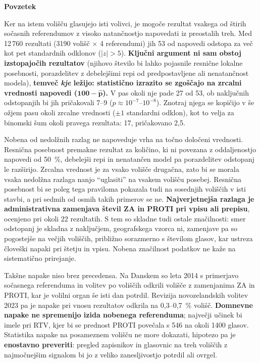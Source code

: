 \documentclass[11pt,a4paper]{article}
\begin{document}
{\small
\begin{center}\textbf{Povzetek}\end{center}\vspace{-1.2em}
\setlength{\parskip}{0.4em}
Ker na istem volišču glasujejo isti volivci, je mogoče rezultat vsakega od štirih sočasnih referendumov z visoko natančnostjo napovedati iz preostalih treh. Med 12\,760 rezultati (3190 volišč $\times$ 4 referendumi) jih 53 od napovedi odstopa za več kot pet standardnih odklonov ($|z|>5$). \textbf{Ključni argument ni sam obstoj izstopajočih rezultatov} (njihovo število bi lahko pojasnile resnične lokalne posebnosti, porazdelitev z debelejšimi repi od predpostavljene ali nenatančnost modela), \textbf{temveč \emph{kje} ležijo: statistično izrazito se zgoščajo na zrcalni vrednosti napovedi ($\boldsymbol{100-\hat p}$).} V pas okoli nje pade 27 od 53, ob naključnih odstopanjih bi jih pričakovali 7--9 ($p\approx10^{-7}$--$10^{-8}$). Znotraj njega se kopičijo v še ožjem pasu okoli zrcalne vrednosti ($\pm1$ standardni odklon), kot to velja za binomski šum okoli pravega rezultata: 17, pričakovano 2,5.

Nobena od nedolžnih razlag ne napoveduje vrha na točno določeni vrednosti. Resnična posebnost premakne rezultat za količino, ki ni povezana z oddaljenostjo napovedi od 50~\%, debelejši repi in nenatančen model pa porazdelitev odstopanj le razširijo. Zrcalna vrednost je za vsako volišče drugačna, zato bi se morala vsaka nedolžna razlaga nanjo ``uglasiti'' na vsakem volišču posebej. Resnična posebnost bi se poleg tega praviloma pokazala tudi na sosednjih voliščih v isti stavbi, a pri sedmih od osmih takih primerov se ne. \textbf{Najverjetnejša razlaga je administrativna zamenjava števil ZA in PROTI pri vpisu ali prepisu}, ocenjeno pri okoli 22 rezultatih. S tem so skladne tudi ostale značilnosti: smer odstopanj je skladna z naključjem, geografskega vzorca ni, zamenjave pa so pogostejše na večjih voliščih, približno sorazmerno s številom glasov, kar ustreza človeški napaki pri štetju in vpisu. Nobena značilnost podatkov ne kaže na sistematično prirejanje.

Takšne napake niso brez precedensa. Na Danskem so leta 2014 s primerjavo sočasnega referenduma in volitev po voliščih odkrili volišče z zamenjanima ZA in PROTI, kar je volilni organ še isti dan potrdil. Revizija novozelandskih volitev 2023 pa je napake pri vnosu rezultatov odkrila na 0,3--0,7~\% volišč. \textbf{Domnevne napake ne spremenijo izida nobenega referenduma}; največji učinek bi imele pri RTV, kjer bi se prednost PROTI povečala s 546 na okoli 1400 glasov. Statistika napake na posameznem volišču ne more dokazati, hipotezo pa je \textbf{enostavno preveriti}: pregled zapisnikov in glasovnic na treh voliščih z najmočnejšim signalom bi jo z veliko zanesljivostjo potrdil ali ovrgel.\par}
\end{document}
